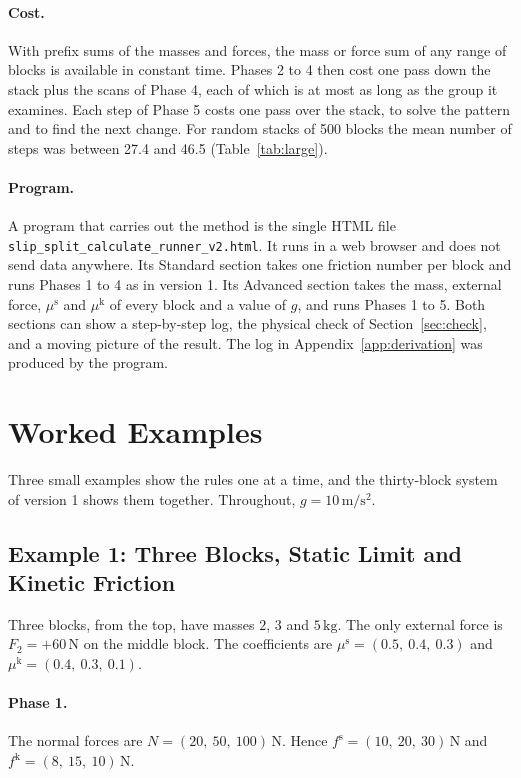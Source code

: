 \documentclass[11pt,a4paper]{article}
\newcommand{\fs}{f^{\mathrm{s}}}
\newcommand{\fkin}{f^{\mathrm{k}}}
\newcommand{\mus}{\mu^{\mathrm{s}}}
\newcommand{\muk}{\mu^{\mathrm{k}}}
\begin{document}
\paragraph{Cost.} With prefix sums of the masses and forces, the mass or force sum of any range of blocks is available in constant time. Phases 2 to 4 then cost one pass down the stack plus the scans of Phase 4, each of which is at most as long as the group it examines. Each step of Phase 5 costs one pass over the stack, to solve the pattern and to find the next change. For random stacks of 500 blocks the mean number of steps was between 27.4 and 46.5 (Table~\ref{tab:large}).

\paragraph{Program.} A program that carries out the method is the single HTML file \texttt{slip\_\allowbreak split\_\allowbreak calculate\_\allowbreak runner\_\allowbreak v2.html}. It runs in a web browser and does not send data anywhere. Its Standard section takes one friction number per block and runs Phases 1 to 4 as in version 1. Its Advanced section takes the mass, external force, $\mus$ and $\muk$ of every block and a value of $g$, and runs Phases 1 to 5. Both sections can show a step-by-step log, the physical check of Section~\ref{sec:check}, and a moving picture of the result. The log in Appendix~\ref{app:derivation} was produced by the program.

\section{Worked Examples}\label{sec:examples}

Three small examples show the rules one at a time, and the thirty-block system of version 1 shows them together. Throughout, $g=10\,\mathrm{m/s^2}$.

\subsection{Example 1: Three Blocks, Static Limit and Kinetic Friction}\label{sec:ex1}

Three blocks, from the top, have masses $2$, $3$ and $5\,\mathrm{kg}$. The only external force is $F_2=+60\,\mathrm{N}$ on the middle block. The coefficients are $\mus=(0.5,\ 0.4,\ 0.3)$ and $\muk=(0.4,\ 0.3,\ 0.1)$.

\paragraph{Phase 1.} The normal forces are $N=(20,\ 50,\ 100)\,\mathrm{N}$. Hence $\fs=(10,\ 20,\ 30)\,\mathrm{N}$ and $\fkin=(8,\ 15,\ 10)\,\mathrm{N}$.
\end{document}
